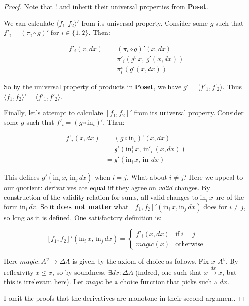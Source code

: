 \documentclass{rntz}
\newcommand\cat\textbf
\newcommand\strong\textbf
\newcommand\Poset{\cat{Poset}}
\newcommand\D\Delta
\newcommand\injc{\mathrm{in}}
\newcommand\inj[1]{\injc_{#1}\,}
\newcommand\fname[1]{\textit{#1}}
\newcommand\validarrow{{\to}}
\newcommand\valid[1]{\mathrel{\overset{#1}{\validarrow}}}
\newcommand\vals[1]{#1^v} %
\newcommand\chgs[1]{\D{#1}}
\newcommand\fork[1]{\langle{#1}\rangle}
\newcommand\funct[1]{\vals{#1}}
\newcommand\deriv[1]{#1'}
\begin{document}
\begin{proof}
  \noindent
  Note that $!$ and {\textexclamdown} inherit their universal properties from
  \Poset{}.

  We can calculate $\deriv{\fork{f_1,f_2}}$ from its universal property.
  Consider some $g$ such that $\deriv f_i = \deriv{(\pi_i \circ g)}$ for $i \in
  \{1,2\}$. Then:

  \begin{align*}
    \deriv f_i(x,dx)
    &= \deriv{(\pi_i \circ g)}(x,dx)\\
    &= \deriv\pi_i (\funct g\,x,\, \deriv g(x,dx))\\
    &= \funct\pi_i(\deriv g(x,dx))
  \end{align*}

  \noindent
  So by the universal property of products in \Poset{}, we have $g' =
  \fork{\deriv f_1, \deriv f_2}$. Thus $\deriv{\fork{f_1,f_2}} = \fork{\deriv
    f_1, \deriv f_2}$.

  Finally, let's attempt to calculate $\deriv{[f_1,f_2]}$ from its universal
  property. Consider some $g$ such that $\deriv f_i = \deriv{(g \circ
    \injc_i)}$. Then:

  \begin{align*}
    \deriv f_i(x,dx)
    &= \deriv{(g \circ \injc_i)}(x,dx)\\
    &= \deriv g (\funct\injc_i \,x,\, \deriv\injc_i \,(x,dx))\\
    &= \deriv g (\inj i x,\, \inj i dx)
  \end{align*}

  \noindent
  This defines $g'(\inj i x,\, \inj j dx)$ when $i = j$. What about $i \ne j$?
  Here we appeal to our quotient: derivatives are equal iff they agree on
  \emph{valid} changes. By construction of the validity relation for sums, all
  valid changes to $\inj i x$ are of the form $\inj i dx$. So it \strong{does
    not matter} what $\deriv{[f_1,f_2]}(\inj i x, \inj j dx)$ does for $i \ne
  j$, so long as it is defined. One satisfactory definition is:

  \begin{equation*}
    \deriv{\left[f_1,f_2\right]} (\inj{i} x,\, \inj{j} dx)
    = \begin{cases}
      \deriv f_i(x,dx) & \text{if}~ i=j\\
      \fname{magic}(x) & \text{otherwise}
    \end{cases}
  \end{equation*}

  \noindent
  Here $\fname{magic} : \vals A \to \chgs A$ is given by the axiom of choice as
  follows. Fix $x : \vals A$. By reflexivity $x \le x$, so by soundness,
  $\exists dx : \chgs A$ (indeed, one such that $x \valid{dx} x$, but this is
  irrelevant here). Let \fname{magic} be a choice function that picks such a
  $dx$.

  I omit the proofs that the derivatives are monotone in their second argument.
\end{proof}
\end{document}
